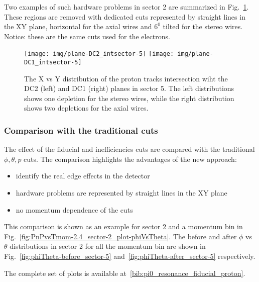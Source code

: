 Two examples of such hardware problems in sector 2 are summarized in Fig.~\ref{fig:xy_dc12_s5}.
These regions are removed with dedicated cuts represented by straight lines in the XY plane,
horizontal for the axial wires and $6^0$ tilted for the stereo wires. Notice: these are the
same cuts used for the electrons.

\begin{figure}[ht]
    \centering
    \texttt{[image: img/plane-DC2\_intsector-5]}
    \texttt{[image: img/plane-DC1\_intsector-5]}
    \caption{The X vs Y distribution of the proton tracks intersection wiht the DC2 (left)
        and DC1 (right) planes in sector 5. The left distributions shows one depletion for the stereo wires,
        while the right distribution shows two depletions for the axial wires.}
    \label{fig:xy_dc12_s5}
\end{figure}

\subsubsection{Comparison with the traditional cuts}

The effect of the fiducial and inefficiencies cuts are compared with the traditional $\phi, \theta, p$ cuts.
The comparison highlights the advantages of the new approach:

\begin{itemize}
    \item identify the real edge effects in the detector
    \item hardware problems are represented by straight lines in the XY plane
    \item no momentum dependence of the cuts
\end{itemize}

This comparison is shown as an example for sector 2 and a momentum bin in Fig.~\ref{fig:PnPvsTmom-2.4_sector-2_plot-phiVsTheta}.
The before and after $\phi$ vs $\theta$ distributions in sector 2 for all the momentum bin are shown in Fig.~\ref{fig:phiTheta-before_sector-5}
and~\ref{fig:phiTheta-after_sector-5} respectively.

The complete set of plots is available at~\ref{bib:pi0_resonance_fiducial_proton}.

